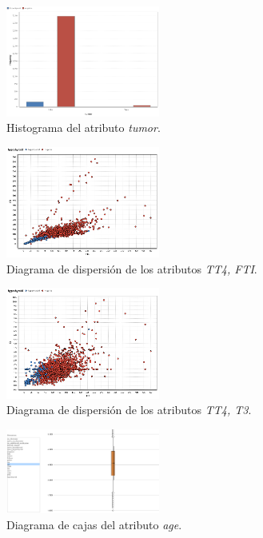 \documentclass[osajnl,twocolumn,showpacs,superscriptaddress,10pt,floatfix]{revtex4-1} %
\begin{document}
\begin{figure}[H]
    \centering
    \includegraphics[width=0.45\textwidth]{analysis/histogram_tumor}
    \caption{Histograma del atributo \textit{tumor}.}
    \label{figure:tumor}
\end{figure}

\begin{figure}[H]
    \centering
    \includegraphics[width=0.45\textwidth]{analysis/scatter_TT4_FTI}
    \caption{Diagrama de dispersión de los atributos \textit{TT4, FTI}.}
    \label{figure:scatter_TT4_FTI}
\end{figure}

\begin{figure}[H]
    \centering
    \includegraphics[width=0.45\textwidth]{analysis/scatter_TT4_T3}
    \caption{Diagrama de dispersión de los atributos \textit{TT4, T3}.}
    \label{figure:scatter_TT4_T3}
\end{figure}

\begin{figure}[H]
    \centering
    \includegraphics[width=0.45\textwidth]{analysis/box_plot_age}
    \caption{Diagrama de cajas del atributo \textit{age}.}
    \label{figure:box_plot_age}
\end{figure}
\end{document}
